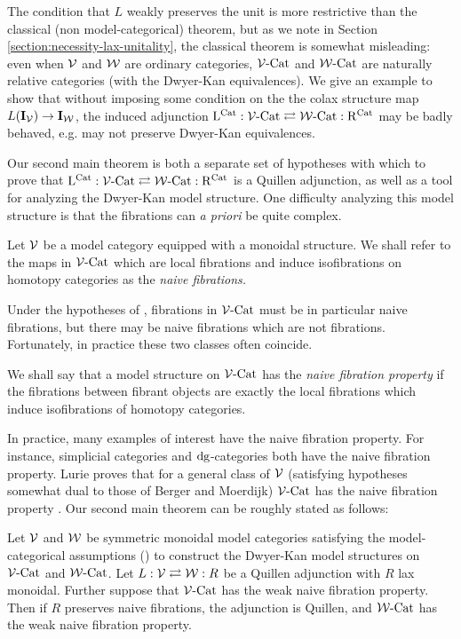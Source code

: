 \documentclass[12pt]{amsart}
\begin{document}
The condition that $L$ weakly preserves the unit is more restrictive than the classical (non model-categorical) theorem, but as we note in Section \ref{section:necessity-lax-unitality}, the classical theorem is somewhat misleading: even when $\mathcal{V}$ and $\mathcal{W}$ are ordinary categories, $\mathcal{V}\text{-}\mathrm{Cat}$ and $\mathcal{W}\text{-}\mathrm{Cat}$ are naturally relative categories (with the Dwyer-Kan equivalences). 
We give an example to show that without imposing some condition on the the colax structure map $L(\mathbf{I}_\mathcal{V}) \to \mathbf{I}_\mathcal{W}$, the induced adjunction $\mathrm{L}^{\mathrm{Cat}}: \mathcal{V}\text{-}\mathrm{Cat} \rightleftarrows \mathcal{W}\text{-}\mathrm{Cat} : \mathrm{R}^{\mathrm{Cat}}$ may be badly behaved, e.g. may not preserve Dwyer-Kan equivalences. 
\par 
Our second main theorem is both a separate set of hypotheses with which to prove that $\mathrm{L}^{\mathrm{Cat}} : \mathcal{V}\text{-}\mathrm{Cat} \rightleftarrows \mathcal{W}\text{-}\mathrm{Cat} : \mathrm{R}^{\mathrm{Cat}}$ is a Quillen adjunction, as well as a tool for analyzing the Dwyer-Kan model structure.
One difficulty analyzing this model structure is that the fibrations can \textit{a priori} be quite complex. 
\begin{definition}\label{dfn:naive-fibration}
	Let $\mathcal{V}$ be a model category equipped with a monoidal structure. 
	We shall refer to the maps in $\mathcal{V}\text{-}\mathrm{Cat}$ which are local fibrations and induce isofibrations on homotopy categories as the \textit{naive fibrations.}
\end{definition}
Under the hypotheses of \cite{BergerMoerdijk2012}, fibrations in $\mathcal{V}\text{-}\mathrm{Cat}$ must be in particular naive fibrations, but there may be naive fibrations which are not fibrations. 
Fortunately, in practice these two classes often coincide.
\begin{definition}\label{dfn:naive-fibration-property}
	We shall say that a model structure on $\mathcal{V}\text{-}\mathrm{Cat}$ has the \emph{naive fibration property} if the fibrations between fibrant objects are exactly the local fibrations which induce isofibrations of homotopy categories.
\end{definition}
In practice, many examples of interest have the naive fibration property. 
For instance, simplicial categories \cite{BergnerModelStructure} and $\mathrm{dg}$-categories \cite{Tabuada2004} both have the naive fibration property. 
Lurie proves that for a general class of $\mathcal{V}$ (satisfying hypotheses somewhat dual to those of Berger and Moerdijk) $\mathcal{V}\text{-}\mathrm{Cat}$ has the naive fibration property \cite{LurieHTT}.
Our second main theorem can be roughly stated as follows:
\begin{alphatheorem}\label{alphathm:simple}
	Let $\mathcal{V}$ and $\mathcal{W}$ be symmetric monoidal model categories satisfying the model-categorical assumptions (\cite{BergerMoerdijk2012}) to construct the Dwyer-Kan model structures on $\mathcal{V}\text{-}\mathrm{Cat}$ and $\mathcal{W}\text{-}\mathrm{Cat}$.
	 Let $L: \mathcal{V} \rightleftarrows \mathcal{W}: R$ be a Quillen adjunction with $R$ lax monoidal. Further suppose that $\mathcal{V}\text{-}\mathrm{Cat}$ has the weak naive fibration property. 
	 Then if $R$ preserves naive fibrations, the adjunction
	 is Quillen, and $\mathcal{W}\text{-}\mathrm{Cat}$ has the weak naive fibration property. 
\end{alphatheorem}
\end{document}
